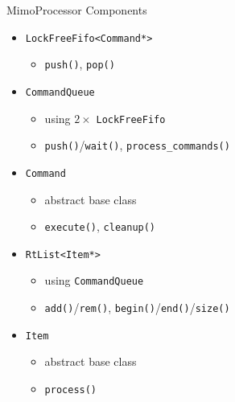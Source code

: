 \documentclass{beamer}
\newcommand{\code}{\texttt}
\begin{document}
\begin{frame}{MimoProcessor Components}
\begin{itemize}[<+->]
\item \code{LockFreeFifo<Command*>}
\begin{itemize}[<.->]
\item \code{push()}, \code{pop()}
\end{itemize}
\item \code{CommandQueue}
\begin{itemize}[<.->]
\item using $2\times$ \code{LockFreeFifo}
\item \code{push()}/\code{wait()}, \code{process\_commands()}
\end{itemize}
\item \code{Command}
\begin{itemize}[<.->]
\item abstract base class
\item \code{execute()}, \code{cleanup()}
\end{itemize}
\item \code{RtList<Item*>}
\begin{itemize}[<.->]
\item using \code{CommandQueue}
\item \code{add()}/\code{rem()}, \code{begin()}/\code{end()}/\code{size()}
\end{itemize}
\item \code{Item}
\begin{itemize}[<.->]
\item abstract base class
\item \code{process()}
\end{itemize}
\end{itemize}
\end{frame}
\end{document}
